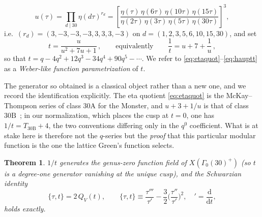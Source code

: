 \documentclass[cntp]{ipart}
\newcommand{\rmd}{\mathrm{d}}
\theoremstyle{plain}
\newtheorem{thm}{Theorem}[section]
\theoremstyle{remark}
\begin{document}
\begin{equation}
u(\tau)=\prod_{d\mid 30}\eta(d\tau)^{r_d}
=\left[\frac{\eta(\tau)\,\eta(6\tau)\,\eta(10\tau)\,\eta(15\tau)}
{\eta(2\tau)\,\eta(3\tau)\,\eta(5\tau)\,\eta(30\tau)}\right]^{3},
\label{eq:etaquot}
\end{equation}
i.e.\ $(r_d)=(3,-3,-3,-3,3,3,3,-3)$ on $d=(1,2,3,5,6,10,15,30)$, and set
\begin{equation}
t=\frac{u}{u^2+7u+1}\,,\qquad\text{equivalently}\qquad \frac1t=u+7+\frac1u\,,
\label{eq:hauptt}
\end{equation}
so that $t=q-4q^2+12q^3-34q^4+90q^5-\cdots$. We refer to
\eqref{eq:etaquot}--\eqref{eq:hauptt} as a \emph{Weber-like function parametrization} of $t$.

The generator so obtained is a classical object rather than a new one, and we record the
identification explicitly. The eta quotient \eqref{eq:etaquot} is the McKay--Thompson series of class
$30\mathrm{A}$ for the Monster, and $u+3+1/u$ is that of class $30\mathrm{B}$~\cite{FordMcKayNorton1994};
in our normalization, which places the cusp at $t=0$, one has $1/t=T_{30\mathrm{B}}+4$, the two
conventions differing only in the $q^0$ coefficient. What is at stake here is therefore not the
$q$-series but the \emph{proof} that this particular modular function is the one the lattice Green's
function selects.

\begin{thm}\label{thm:modular}
$1/t$ generates the genus-zero function field of $X(\Gamma_0(30)^+)$ (so $t$ is a degree-one
generator vanishing at the unique cusp), and the Schwarzian identity
\begin{equation}
\{\tau,t\}=2\,Q_V(t),\qquad
\{\tau,t\}\equiv\frac{\tau'''}{\tau'}-\frac32\Big(\frac{\tau''}{\tau'}\Big)^{\!2},
\quad{}'=\frac{\rmd}{\rmd t},
\label{eq:schwarz}
\end{equation}
holds exactly.
\end{thm}
\end{document}
